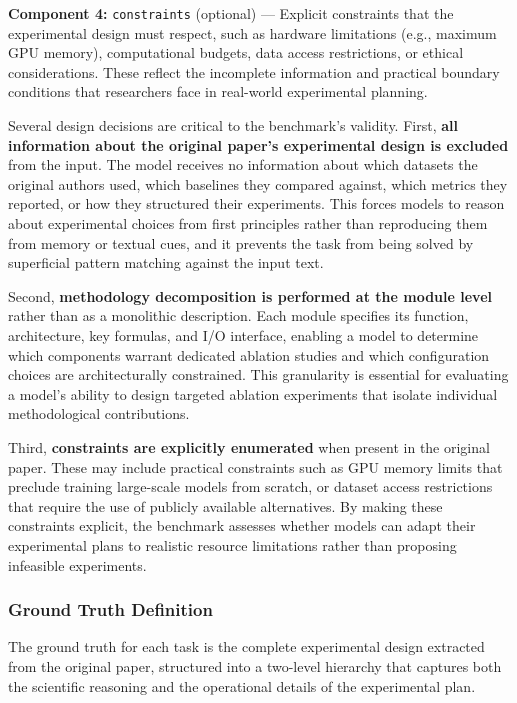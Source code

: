 \begin{tcolorbox}
\textbf{Component 4:} \texttt{constraints} (optional) — Explicit constraints that the experimental design must respect, such as hardware limitations (e.g., maximum GPU memory), computational budgets, data access restrictions, or ethical considerations. These reflect the incomplete information and practical boundary conditions that researchers face in real-world experimental planning.
\end{tcolorbox}

\medskip

Several design decisions are critical to the benchmark's validity. First, \textbf{all information about the original paper's experimental design is excluded} from the input. The model receives no information about which datasets the original authors used, which baselines they compared against, which metrics they reported, or how they structured their experiments. This forces models to reason about experimental choices from first principles rather than reproducing them from memory or textual cues, and it prevents the task from being solved by superficial pattern matching against the input text.

Second, \textbf{methodology decomposition is performed at the module level} rather than as a monolithic description. Each module specifies its function, architecture, key formulas, and I/O interface, enabling a model to determine which components warrant dedicated ablation studies and which configuration choices are architecturally constrained. This granularity is essential for evaluating a model's ability to design targeted ablation experiments that isolate individual methodological contributions.

Third, \textbf{constraints are explicitly enumerated} when present in the original paper. These may include practical constraints such as GPU memory limits that preclude training large-scale models from scratch, or dataset access restrictions that require the use of publicly available alternatives. By making these constraints explicit, the benchmark assesses whether models can adapt their experimental plans to realistic resource limitations rather than proposing infeasible experiments.

\subsubsection{Ground Truth Definition}

The ground truth for each task is the complete experimental design extracted from the original paper, structured into a two-level hierarchy that captures both the scientific reasoning and the operational details of the experimental plan.

